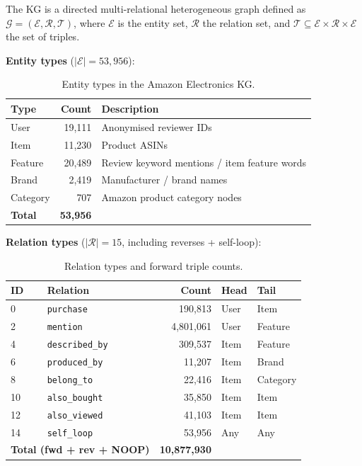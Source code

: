 \documentclass[12pt,a4paper]{article}
\begin{document}
The KG is a directed multi-relational heterogeneous graph defined as
$\mathcal{G} = (\mathcal{E}, \mathcal{R}, \mathcal{T})$, where
$\mathcal{E}$ is the entity set, $\mathcal{R}$ the relation set, and
$\mathcal{T} \subseteq \mathcal{E} \times \mathcal{R} \times \mathcal{E}$
the set of triples.

\medskip
\noindent\textbf{Entity types} ($|\mathcal{E}| = 53{,}956$):

\begin{table}[h]
\centering
\caption{Entity types in the Amazon Electronics KG.}
\label{tab:entities}
\begin{tabular}{lrl}
\toprule
\textbf{Type} & \textbf{Count} & \textbf{Description} \\
\midrule
User     & 19,111 & Anonymised reviewer IDs \\
Item     & 11,230 & Product ASINs \\
Feature  & 20,489 & Review keyword mentions / item feature words \\
Brand    & 2,419  & Manufacturer / brand names \\
Category & 707    & Amazon product category nodes \\
\midrule
\textbf{Total} & \textbf{53,956} & \\
\bottomrule
\end{tabular}
\end{table}

\noindent\textbf{Relation types} ($|\mathcal{R}| = 15$, including reverses + self-loop):

\begin{table}[h]
\centering
\caption{Relation types and forward triple counts.}
\label{tab:relations}
\begin{tabular}{llrll}
\toprule
\textbf{ID} & \textbf{Relation} & \textbf{Count} &
\textbf{Head} & \textbf{Tail} \\
\midrule
0  & \texttt{purchase}      & 190,813   & User     & Item     \\
2  & \texttt{mention}       & 4,801,061 & User     & Feature  \\
4  & \texttt{described\_by} & 309,537   & Item     & Feature  \\
6  & \texttt{produced\_by}  & 11,207    & Item     & Brand    \\
8  & \texttt{belong\_to}    & 22,416    & Item     & Category \\
10 & \texttt{also\_bought}  & 35,850    & Item     & Item     \\
12 & \texttt{also\_viewed}  & 41,103    & Item     & Item     \\
14 & \texttt{self\_loop}    & 53,956    & Any      & Any      \\
\midrule
\multicolumn{2}{l}{\textbf{Total (fwd + rev + NOOP)}} & \textbf{10,877,930} & & \\
\bottomrule
\end{tabular}
\end{table}
\end{document}
